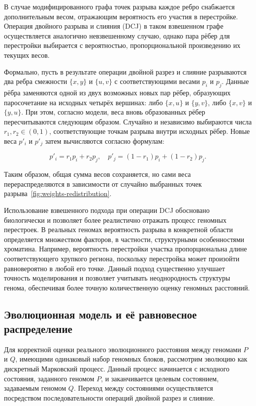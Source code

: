 В случае модифицированного графа точек разрыва каждое ребро снабжается дополнительным весом, отражающим вероятность его участия в перестройке. 
Операция двойного разрыва и слияния (DCJ) в таком взвешенном графе осуществляется аналогично невзвешенному случаю, однако пара рёбер для перестройки выбирается с вероятностью, пропорциональной произведению их текущих весов. 

Формально, пусть в результате операции двойной разрез и слияние разрываются два ребра смежности $\{x, y\}$ и $\{u, v\}$ с соответствующими весами $p_i$ и $p_j$.
Данные рёбра заменяются одной из двух возможных новых пар рёбер, образующих паросочетание на исходных четырёх вершинах: либо $\{x, u\}$ и $\{y, v\}$, либо $\{x, v\}$ и $\{y, u\}$.
При этом, согласно модели, веса вновь образованных рёбер пересчитываются следующим образом.
Случайно и независимо выбираются числа $r_1, r_2 \in (0, 1)$, соответствующие точкам разрыва внутри исходных рёбер.
Новые веса $p'_i$ и $p'_j$ затем вычисляются согласно формулам:

\[
p'_i = r_1 p_i + r_2 p_j,\quad p'_j = (1 - r_1) p_i + (1 - r_2) p_j.
\]

Таким образом, общая сумма весов сохраняется, но сами веса перераспределяются в зависимости от случайно выбранных точек разрыва~\ref{fig:weights-redistribution}.

Использование взвешенного подхода при операции DCJ обосновано биологически и позволяет более реалистично отражать процесс геномных перестроек.
В реальных геномах вероятность разрыва в конкретной области определяется множеством факторов, в частности, структурными особенностями хроматина. Например, вероятность перестройки участка пропорциональна длине соответствующего хрупкого региона, поскольку перестройка может произойти равновероятно в любой его точке.
Данный подход существенно улучшает точность моделирования и позволяет учитывать неоднородность структуры генома, обеспечивая более точную количественную оценку геномных расстояний.

\subsection{Эволюционная модель и её равновесное распределение}

Для корректной оценки реального эволюционного расстояния между геномами $P$ и $Q$, имеющими одинаковый набор геномных блоков, рассмотрим эволюцию как дискретный Марковский процесс.
Данный процесс начинается с исходного состояния, заданного геномом $P$, и заканчивается целевым состоянием, задаваемым геномом $Q$.
Переход между состояниями осуществляется посредством последовательности операций двойной разрез и слияние.

